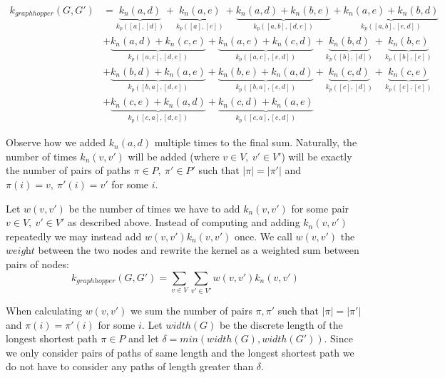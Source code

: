 \documentclass{article}
\begin{document}
\begin{equation}
\label{eq:example_sum}
\begin{split}
k_{graphhopper}(G,G')	&=  \underbrace{k_n(a,d)}_{k_p([a],[d])} + \underbrace{k_n(a, e)}_{k_p([a],[e])} + \underbrace{k_n(a, d) + k_n(b, e)}_{k_p([a,b],[d,e])} + \underbrace{k_n(a, e) + k_n(b, d)}_{k_p([a,b],[e,d])} \\ 
				&+ \underbrace{k_n(a, d) + k_n(c, e)}_{k_p([a,c],[d,e])} + \underbrace{k_n(a, e) + k_n(c, d)}_{k_p([a,c],[e,d])} + \underbrace{k_n(b, d)}_{k_p([b],[d])} + \underbrace{k_n(b, e)}_{k_p([b],[e])} \\
				&+ \underbrace{k_n(b, d) + k_n(a, e)}_{k_p([b,a],[d,e])} + \underbrace{k_n(b, e) + k_n(a, d)}_{k_p([b,a],[e,d])} + \underbrace{k_n(c, d)}_{k_p([c],[d])} + \underbrace{k_n(c, e)}_{k_p([c],[e])} \\
				&+ \underbrace{k_n(c, e) + k_n(a, d)}_{k_p([c,a],[d,e])}+ \underbrace{k_n(c, d) + k_n(a, e)}_{k_p([c,a],[e,d])}
\end{split}
\end{equation}

Observe how we added $k_n(a,d)$ multiple times to the final sum. Naturally, the number of times $k_n(v, v')$ will be added (where $v\in V,\ v'\in V'$) will be exactly the number of pairs of paths $\pi\in P,\ \pi'\in P'$ such that $|\pi|=|\pi'|$ and $\pi(i)=v,\ \pi'(i)=v'$ for some $i$.

Let $w(v, v')$ be the number of times we have to add $k_n(v, v')$ for some pair $v\in V,\ v'\in V'$ as described above. Instead of computing and adding $k_n(v, v')$ repeatedly we may instead add $w(v,v') k_n(v, v')$ once. We call $w(v, v')$ the $\textit{weight}$ between the two nodes and rewrite the kernel as a weighted sum between pairs of nodes:
\begin{equation}
\label{eq:k_graphhopper}
k_{graphhopper}(G,G')=\sum_{v\in V}\sum_{v'\in V'}w(v,v')k_n(v,v')
\end{equation}


When calculating $w(v,v')$ we sum the number of pairs $\pi,\pi'$ such that $|\pi|=|\pi'|$ and $\pi(i)=\pi'(i)$ for some $i$. Let $width(G)$ be the discrete length of the longest shortest path $\pi\in P$ and let $\delta=min(width(G), width(G'))$. Since we only consider pairs of paths of same length and the longest shortest path we do not have to consider any paths of length greater than $\delta$.
\end{document}
